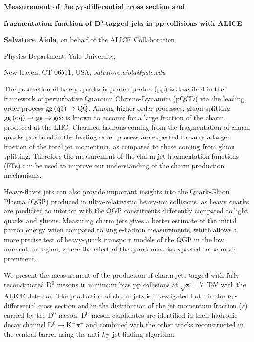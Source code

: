\documentclass[12pt]{article}
\begin{document}
\centerline{\bf 
Measurement of the $p_{\rm T}$-differential cross section and
}

\centerline{\bf 
fragmentation function of D$^0$-tagged jets in pp collisions with ALICE
}

\vspace{12pt}

\centerline{ {\bf Salvatore Aiola}, on behalf of the ALICE Collaboration }

\vspace{12pt}

\centerline{Physics Department, Yale University,
}\centerline{New Haven, CT 06511, USA, {\it salvatore.aiola@yale.edu}}

\vspace{12pt}


\vspace{12pt} \vspace{12pt}

The production of heavy quarks in proton-proton (pp) is described in the framework of perturbative Quantum Chromo-Dynamics (pQCD) 
via the leading order process ${\rm gg\, (q\bar{q})} \rightarrow {\rm Q\bar{Q}}$.
Among higher-order processes, gluon splitting ${\rm gg\, (q\bar{q})} \rightarrow {\rm gg} \rightarrow \rm gc\bar{c}$
is known to account for a large fraction of the charm produced at the LHC.
Charmed hadrons coming from the fragmentation of charm quarks
produced in the leading order process
are expected to carry a larger fraction of the total jet momentum,
as compared to those coming from gluon splitting.
Therefore the measurement of the charm jet fragmentation functions (FFs) 
can be used to improve our understanding of the charm production mechanisms.

Heavy-flavor jets can also provide important insights into the Quark-Gluon Plasma (QGP)
produced in ultra-relativistic heavy-ion collisions, as heavy quarks are predicted
to interact with the QGP constituents differently compared to light quarks and gluons. 
Measuring charm jets gives a better estimate of the initial parton energy
when compared to single-hadron measurements, which allows a more precise test of 
heavy-quark transport models of the QGP in the low momentum region,
where the effect of the quark mass is expected to be more prominent.

We present the measurement of the production of charm jets tagged with fully reconstructed D$^0$ mesons in minimum bias pp collisions at $\sqrt{s} = 7$~TeV with the ALICE detector. 
The production of charm jets is investigated both in the $p_{\rm T}$-differential cross section and in the distribution of the jet momentum fraction ($z$) carried by the D$^0$ meson.
D$^0$-meson candidates are identified in their hadronic decay channel D$^0\rightarrow$K$^{-}\pi^{+}$ and combined with the other tracks reconstructed in the central barrel using the anti-$k_{\rm T}$ jet-finding algorithm.
\end{document}
